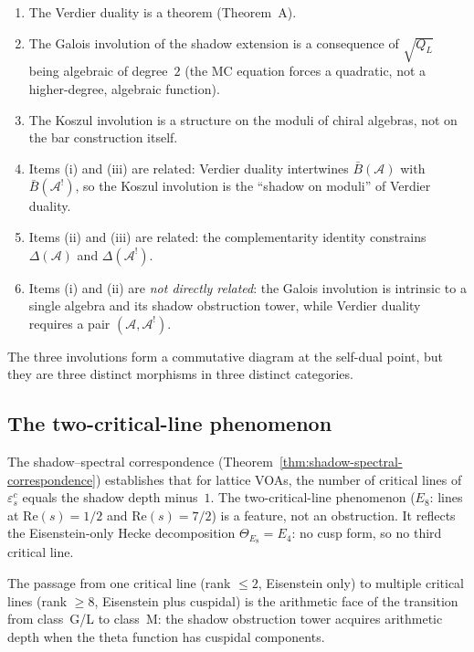 \documentclass[11pt]{article}
\newcommand{\cA}{\mathcal{A}}
\newcommand{\B}{\bar{B}}
\begin{document}
\begin{observation}
\label{obs:three-involutions}
\begin{enumerate}[label=\textup{(\roman*)}, nosep]
\item The Verdier duality is a theorem (Theorem~A).
\item The Galois involution of the shadow extension is a
  consequence of $\sqrt{Q_L}$ being algebraic of degree~$2$
  (the MC equation forces a quadratic, not a higher-degree,
  algebraic function).
\item The Koszul involution is a structure on the moduli of
  chiral algebras, not on the bar construction itself.
\item Items (i) and (iii) are related: Verdier duality
  intertwines $\B(\cA)$ with $\B(\cA^!)$, so the Koszul
  involution is the ``shadow on moduli'' of Verdier duality.
\item Items (ii) and (iii) are related: the complementarity
  identity constrains $\Delta(\cA)$ and $\Delta(\cA^!)$.
\item Items (i) and (ii) are \emph{not directly related}:
  the Galois involution is intrinsic to a single algebra
  and its shadow obstruction tower, while Verdier duality requires
  a pair $(\cA, \cA^!)$.
\end{enumerate}
The three involutions form a commutative diagram at the
self-dual point, but they are three distinct morphisms in
three distinct categories.
\end{observation}

\subsection{The two-critical-line phenomenon}

The shadow--spectral correspondence
(Theorem~\ref{thm:shadow-spectral-correspondence}) establishes
that for lattice VOAs, the number of critical lines of
$\varepsilon^c_s$ equals the shadow depth minus~$1$.  The
two-critical-line phenomenon ($E_8$: lines at $\mathrm{Re}(s) = 1/2$
and $\mathrm{Re}(s) = 7/2$) is a feature, not an obstruction.
It reflects the Eisenstein-only Hecke decomposition
$\Theta_{E_8} = E_4$: no cusp form, so no third critical line.

The passage from one critical line (rank $\leq 2$, Eisenstein
only) to multiple critical lines (rank $\geq 8$, Eisenstein plus
cuspidal) is the arithmetic face of the transition from class~G/L
to class~M: the shadow obstruction tower acquires arithmetic depth when the
theta function has cuspidal components.
\end{document}
